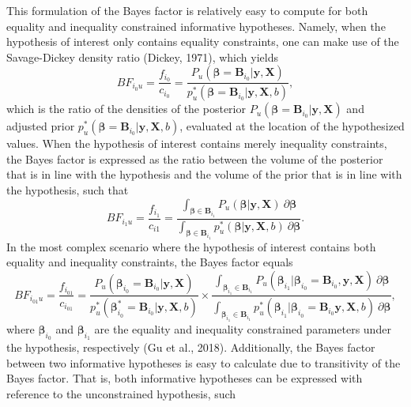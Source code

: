 \documentclass[
]{interact}
\begin{document}
This formulation of the Bayes factor is relatively easy to compute for
both equality and inequality constrained informative hypotheses. Namely,
when the hypothesis of interest only contains equality constraints, one
can make use of the Savage-Dickey density ratio (Dickey, 1971), which
yields \[
BF_{i_0u} = \frac{f_{i_0}}{c_{i_0}} = \frac{
  P_u(\boldsymbol{\beta} = \boldsymbol{B}_{i_0} | \boldsymbol{y}, \boldsymbol{X})
}{
  p_u^*(\boldsymbol{\beta} = \boldsymbol{B}_{i_0} | \boldsymbol{y}, \boldsymbol{X}, b)
},
\] which is the ratio of the densities of the posterior
\(P_u(\boldsymbol{\beta} = \boldsymbol{B}_{i_0} | \boldsymbol{y}, \boldsymbol{X})\)
and adjusted prior
\(p^*_u(\boldsymbol{\beta} = \boldsymbol{B}_{i_0} | \boldsymbol{y}, \boldsymbol{X}, b)\),
evaluated at the location of the hypothesized values. When the
hypothesis of interest contains merely inequality constraints, the Bayes
factor is expressed as the ratio between the volume of the posterior
that is in line with the hypothesis and the volume of the prior that is
in line with the hypothesis, such that \[
BF_{i_1u} = \frac{f_{i_1}}{c_{i1}} = 
\frac{
  \int_{\boldsymbol{\beta} \in \boldsymbol{B}_{i_1}} P_u(\boldsymbol{\beta} | \boldsymbol{y}, \boldsymbol{X}) ~ \partial \boldsymbol{\beta}
}{
  \int_{\boldsymbol{\beta} \in \boldsymbol{B}_{i_1}} p_u^*(\boldsymbol{\beta} | \boldsymbol{y}, \boldsymbol{X}, b) ~ \partial \boldsymbol{\beta}
}.
\] In the most complex scenario where the hypothesis of interest
contains both equality and inequality constraints, the Bayes factor
equals \[
BF_{i_{01}u} = \frac{f_{i_{01}}}{c_{i_{01}}} = \frac{
  P_u(\boldsymbol{\beta}_{i_0} = \boldsymbol{B}_{i_0} | \boldsymbol{y}, \boldsymbol{X})
}{
  p^*_u(\boldsymbol{\beta}^*_{i_0} = \boldsymbol{B}_{i_0} | \boldsymbol{y}, \boldsymbol{X}, b)
} \times
\frac{
  \int_{\boldsymbol{\beta}_{i_1} \in \boldsymbol{B}_{i_1}} P_u(\boldsymbol{\beta}_{i_1} | \boldsymbol{\beta}_{i_0} = \boldsymbol{B}_{i_0}, \boldsymbol{y}, \boldsymbol{X}) ~ \partial \boldsymbol{\beta}
}{
  \int_{\boldsymbol{\beta}_{i_1} \in \boldsymbol{B}_{i_1}} p^*_u(\boldsymbol{\beta}_{i_1} | \boldsymbol{\beta}_{i_0} = \boldsymbol{B}_{i_0} \boldsymbol{y}, \boldsymbol{X}, b) ~ \partial \boldsymbol{\beta}
},
\] where \(\boldsymbol{\beta}_{i_0}\) and \(\boldsymbol{\beta}_{i_1}\)
are the equality and inequality constrained parameters under the
hypothesis, respectively (Gu et al., 2018). Additionally, the Bayes
factor between two informative hypotheses is easy to calculate due to
transitivity of the Bayes factor. That is, both informative hypotheses
can be expressed with reference to the unconstrained hypothesis, such
\end{document}
